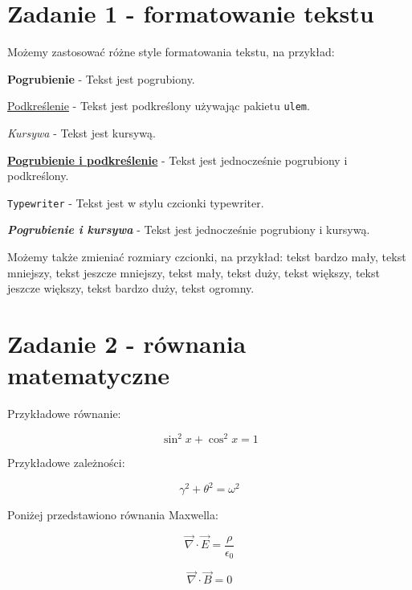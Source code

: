 \documentclass[b5paper,11pt]{article}
\begin{document}
\begin{spacing}{1.5} %

    \section{Zadanie 1 - formatowanie tekstu}

    Możemy zastosować różne style formatowania tekstu, na przykład:

    \textbf{Pogrubienie} - Tekst jest pogrubiony.

    \uline{Podkreślenie} - Tekst jest podkreślony używając pakietu \texttt{ulem}.

    \textit{Kursywa} - Tekst jest kursywą.

    \textbf{\uline{Pogrubienie i podkreślenie}} - Tekst jest jednocześnie pogrubiony i podkreślony.

    \texttt{Typewriter} - Tekst jest w stylu czcionki typewriter.

    \textbf{\textit{Pogrubienie i kursywa}} - Tekst jest jednocześnie pogrubiony i kursywą.

    Możemy także zmieniać rozmiary czcionki, na przykład: {\tiny tekst bardzo mały}, {\scriptsize tekst mniejszy}, {\footnotesize tekst jeszcze mniejszy}, {\small tekst mały}, {\large tekst duży}, {\Large tekst większy}, {\LARGE tekst jeszcze większy}, {\huge tekst bardzo duży}, {\Huge tekst ogromny}.


    \newpage
    \section{Zadanie 2 - równania matematyczne}

    Przykładowe równanie:

    \[
        \sin^2 x + \cos^2 x = 1
    \]

    Przykładowe zależności:

    \begin{equation}
        \gamma^2 + \theta^2 = \omega^2 \label{eq:example1}
    \end{equation}

    Poniżej przedstawiono równania Maxwella:

    \begin{equation}
        \vec{\nabla} \cdot \vec{E} = \frac{\rho}{\epsilon_0} \label{eq:maxwell1}
    \end{equation}

    \begin{equation}
        \vec{\nabla} \cdot \vec{B} = 0 \label{eq:maxwell2}
    \end{equation}


\end{spacing}
\end{document}
